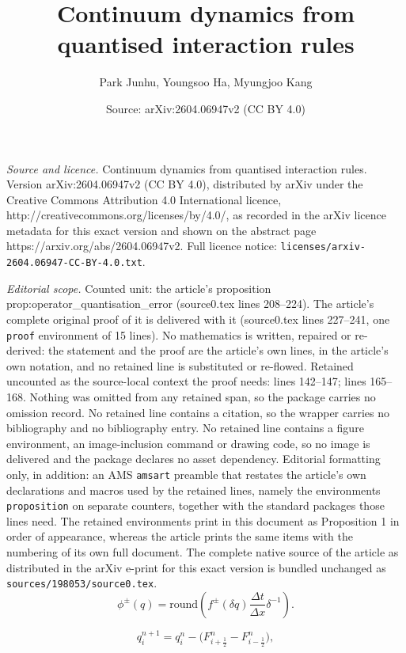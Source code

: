 \documentclass[10pt,a4paper]{amsart}
\title{Continuum dynamics from quantised interaction rules}
\author{Park Junhu, Youngsoo Ha, Myungjoo Kang}
\date{Source: arXiv:2604.06947v2 (CC BY 4.0)}
\begin{document}
\maketitle

\noindent\emph{Source and licence.} Continuum dynamics from quantised interaction rules. Version arXiv:2604.06947v2 (CC BY 4.0), distributed by arXiv under the Creative Commons Attribution 4.0 International licence, http://creativecommons.org/licenses/by/4.0/, as recorded in the arXiv licence metadata for this exact version and shown on the abstract page https://arxiv.org/abs/2604.06947v2. Full licence notice: \texttt{licenses/arxiv-2604.06947-CC-BY-4.0.txt}.\par\smallskip

\noindent\textit{Editorial scope.} Counted unit: the article's proposition prop:operator\_quantisation\_error (source0.tex lines 208--224). The article's complete original proof of it is delivered with it (source0.tex lines 227--241, one \texttt{proof} environment of 15 lines). No mathematics is written, repaired or re-derived: the statement and the proof are the article's own lines, in the article's own notation, and no retained line is substituted or re-flowed.  Retained uncounted as the source-local context the proof needs: lines 142--147; lines 165--168.  Nothing was omitted from any retained span, so the package carries no omission record.  No retained line contains a citation, so the wrapper carries no bibliography and no bibliography entry.  No retained line contains a figure environment, an image-inclusion command or drawing code, so no image is delivered and the package declares no asset dependency.  Editorial formatting only, in addition: an AMS \texttt{amsart} preamble that restates the article's own declarations and macros used by the retained lines, namely the environments \texttt{proposition} on separate counters, together with the standard packages those lines need.  The retained environments print in this document as Proposition 1 in order of appearance, whereas the article prints the same items with the numbering of its own full document.  The complete native source of the article as distributed in the arXiv e-print for this exact version is bundled unchanged as \texttt{sources/198053/source0.tex}.
\begin{equation}
\phi^\pm(q) = \mathrm{round}\!\left(
 f^\pm(\delta q)\frac{\Delta t}{\Delta x}\delta^{-1}
\right).
\label{eq:flux_table}
\end{equation}

\begin{equation}
q_i^{n+1}=q_i^n-\bigl(F_{i+\frac12}^n-F_{i-\frac12}^n\bigr),
\label{eq:update_rule_conservative_form}
\end{equation}
\end{document}
